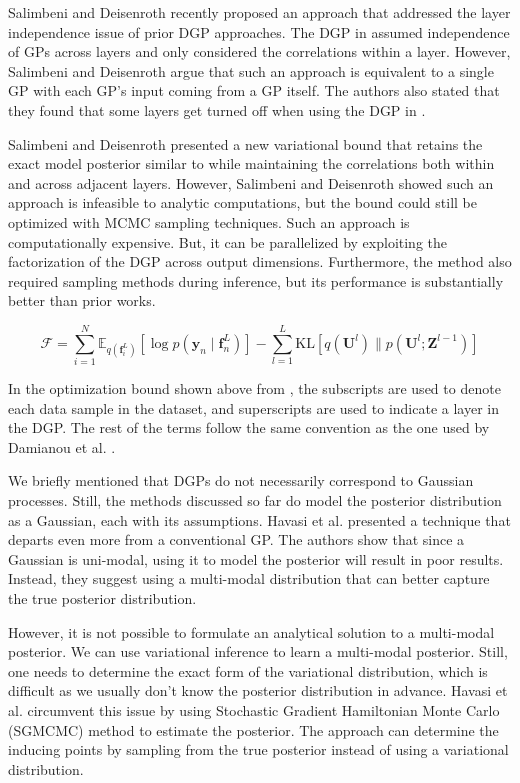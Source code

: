 \documentclass[letterpaper,11pt]{extarticle}
\begin{document}
Salimbeni and Deisenroth \cite{SalimbeniD17} recently proposed an approach that addressed the layer independence issue of prior DGP approaches. The DGP in \cite{DamianouL13} assumed independence of GPs across layers and only considered the correlations within a layer. However, Salimbeni and Deisenroth argue that such an approach is equivalent to a single GP with each GP's input coming from a GP itself. The authors also stated that they found that some layers get turned off when using the DGP in \cite{DamianouL13}. 

Salimbeni and Deisenroth \cite{SalimbeniD17} presented a new variational bound that retains the exact model posterior similar to \cite{DamianouL13} while maintaining the correlations both within and across adjacent layers. However, Salimbeni and Deisenroth showed such an approach is infeasible to analytic computations, but the bound could still be optimized with MCMC sampling techniques. Such an approach is computationally expensive. But, it can be parallelized by exploiting the factorization of the DGP across output dimensions. Furthermore, the method also required sampling methods during inference, but its performance is substantially better than prior works.  

$$
\mathcal{F}=\sum_{i=1}^{N} \mathbb{E}_{q\left(\mathbf{f}_{i}^{L}\right)}\left[\log p\left(\mathbf{y}_{n} \mid \mathbf{f}_{n}^{L}\right)\right]-\sum_{l=1}^{L} \mathrm{KL}\left[q\left(\mathbf{U}^{l}\right) \| p\left(\mathbf{U}^{l} ; \mathbf{Z}^{l-1}\right)\right]
$$

In the optimization bound shown above from \cite{SalimbeniD17}, the subscripts are used to denote each data sample in the dataset, and superscripts are used to indicate a layer in the DGP. The rest of the terms follow the same convention as the one used by Damianou et al. \cite{DamianouL13}.

We briefly mentioned that DGPs do not necessarily correspond to Gaussian processes. Still, the methods discussed so far do model the posterior distribution as a Gaussian, each with its assumptions. Havasi et al. \cite{HavasiLF18} presented a technique that departs even more from a conventional GP. The authors show that since a Gaussian is uni-modal, using it to model the posterior will result in poor results. Instead, they suggest using a multi-modal distribution that can better capture the true posterior distribution.  

However, it is not possible to formulate an analytical solution to a multi-modal posterior. We can use variational inference to learn a multi-modal posterior. Still, one needs to determine the exact form of the variational distribution, which is difficult as we usually don't know the posterior distribution in advance. Havasi et al. \cite{HavasiLF18} circumvent this issue by using Stochastic Gradient Hamiltonian Monte Carlo (SGMCMC) \cite{ChenFG14} method to estimate the posterior. The approach can determine the inducing points by sampling from the true posterior instead of using a variational distribution.  
\end{document}
